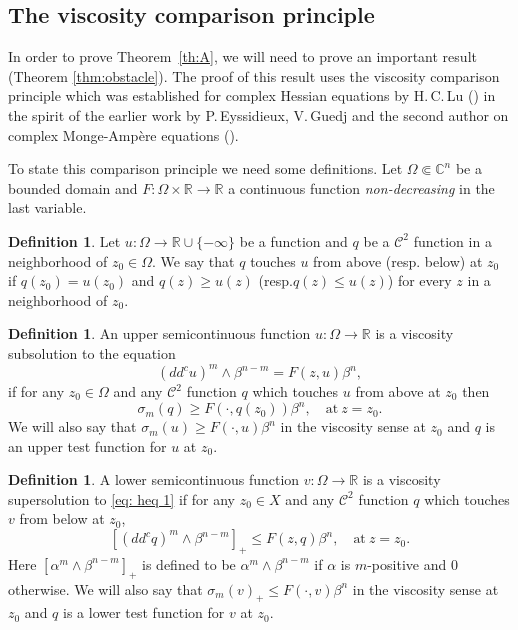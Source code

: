\documentclass[11pt]{article}
\newcommand{\resp}{resp.\xspace}
\providecommand{\C}{}
\numberwithin{equation}{section}
\theoremstyle{definition}
\newtheorem{definition}[theorem]{Definition}
\newcommand{\R}{\mathbb{R}}
\renewcommand{\C}{\mathbb{C}}
\newcommand{\Cc}{\mathcal{C}}
\theoremstyle{plain}
\theoremstyle{definition}
\begin{document}
\subsection{The viscosity comparison principle}

In order to prove Theorem~\ref{th:A}, we will need to prove an important result (Theorem \ref{thm:obstacle}). The proof of this result uses the viscosity comparison principle which was established for complex Hessian equations by H.\,C.\,Lu (\cite{Lu13}) in the spirit of the earlier work by P.\,Eyssidieux, V.\,Guedj and the second author on complex Monge-Ampère equations (\cite{EGZ11}).

To state this comparison principle we need some definitions. Let $\Omega \Subset \C^n$ be a bounded domain and $F: \Omega \times \R \to \R$ a continuous function \emph{non-decreasing} in the last variable.
\begin{definition}
Let $u: \Omega\to \R\cup\{-\infty\}$ be a function and $q$ be a $\Cc^2$ function in a neighborhood of $z_0\in \Omega$. We say that $q$ touches $u$ from above (\resp below) at $z_0$ if $q(z_0)=u(z_0)$ and $q(z)\geq u(z)$ (\resp $q(z)\leq u(z)$) for every $z$ in a neighborhood of $z_0$.
\end{definition}

\begin{definition}\label{def: viscosity subsolution}
An upper semicontinuous function $u: \Omega\to \R$ is a viscosity subsolution to the equation
\begin{equation}\label{eq: heq 1}
(dd^c u)^m\wedge \beta^{n-m} = F(z,u)\beta^n,
\end{equation}
if for any $z_0\in \Omega$ and any $\Cc^2$ function $q$ which touches $u$ from above at $z_0$ then
\[
\sigma_m(q) \geq F(\cdot,q (z_0))\beta^n, \quad \text{at} \ z = z_0.
\]
We will also say that $\sigma_m(u)\geq F(\cdot,u)\beta^n$ in the viscosity sense at $z_0$ and $q$ is an upper test function for $u$ at $z_0$.
\end{definition}
\begin{definition}\label{def: viscosity supersolution}
A lower semicontinuous function $v: \Omega \to \R$ is a viscosity supersolution to \eqref{eq: heq 1} if for any $z_0\in X$ and any $\Cc^2$ function $q$ which touches $v$ from below at $z_0$,
\[
[(dd^c q)^m\wedge \beta^{n-m}]_+\leq F(z,q)\beta^n, \quad \text{at} \ z = z_0.
\]
Here $[\alpha^m\wedge\beta^{n-m}]_+$ is defined to be $\alpha^m\wedge\beta^{n-m} $ if $\alpha$ is $m$-positive and $0$ otherwise. We will also say that $\sigma_m(v)_+ \leq F(\cdot,v)\beta^n$ in the viscosity sense at $z_0$ and $q$ is a lower test function for $v$ at $z_0$.
\end{definition}
\end{document}
